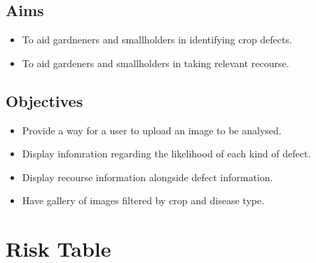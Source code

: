   \subsection{Aims}
    \begin{itemize}
      \item To aid gardneners and smallholders in identifying crop defects.
      \item To aid gardeners and smallholders in taking relevant recourse.
    \end{itemize}
  \subsection{Objectives}
    \begin{itemize}
      \item Provide a way for a user to upload an image to be analysed.
      \item Display infomration regarding the likelihood of each kind of defect.
      \item Display recourse information alongside defect information.
      \item Have gallery of images filtered by crop and disease type.
    \end{itemize}

\section{Risk Table}


